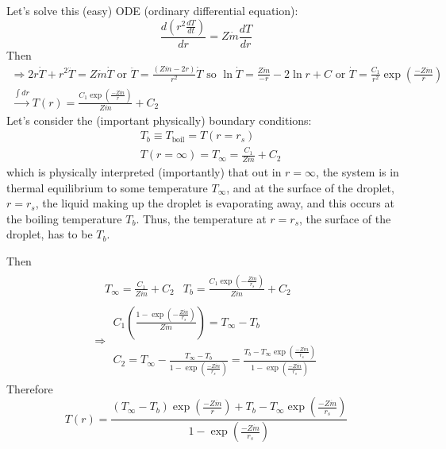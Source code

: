 \documentclass[10pt]{amsart}
\begin{document}
\begin{multicols*}{2}
Let's solve this (easy) ODE (ordinary differential equation):
\[
\frac{d (r^2 \frac{dT}{dt})}{dr} = Z\dot{m} \frac{dT}{dr}
\]
Then 
\[
\begin{gathered}
  \Longrightarrow 2r\dot{T} + r^2 \ddot{T} = Z\dot{m} \dot{T} \text{ or } \ddot{T} = \frac{(Z\dot{m}-2r)}{r^2} \dot{T} \text{ so } \ln{ \dot{T}} = \frac{Z\dot{m}}{-r} - 2\ln{r} + C \text{ or } \dot{T} = \frac{C_1}{r^2} \exp{ \left( \frac{-Z\dot{m }}{r} \right) } \\ 
  \xrightarrow{ \int dr } T(r) = \frac{C_1 \exp{ \left( \frac{-Z\dot{m}}{r} \right) } }{ Z\dot{m}} + C_2
\end{gathered}
\]
Let's consider the (important physically) boundary conditions:
\begin{equation}
  \begin{aligned}
    & T_b \equiv T_{\text{boil}} = T(r=r_s) \\ 
    & T(r=\infty) = T_{\infty} = \frac{C_1}{Z\dot{m}} + C_2
  \end{aligned}
\end{equation}
which is physically interpreted (importantly) that out in $r=\infty$, the system is in thermal equilibrium to some temperature $T_{\infty}$, and at the surface of the droplet, $r=r_s$, the liquid making up the droplet is evaporating away, and this occurs at the boiling temperature $T_b$.  Thus, the temperature at $r=r_s$, the surface of the droplet, has to be $T_b$.  

Then
\[
\begin{gathered}
  \begin{aligned}
    &  T_{\infty} = \frac{C_1}{Z\dot{m}} + C_2
    &  T_b = \frac{C_1 \exp{ \left( -\frac{Z\dot{m}}{r_s} \right) } }{Z\dot{m} } + C_2
  \end{aligned} \\
\Longrightarrow \begin{gathered} C_1 \left( \frac{1- \exp{ \left( -\frac{Z\dot{m}}{r_s} \right) } }{Z\dot{m}} \right) = T_{\infty} - T_b \\
  C_2 = T_{\infty} - \frac{T_{\infty} - T_b }{ 1 - \exp{ \left( \frac{-Z \dot{m}}{ r_s } \right) } } = \frac{ T_b - T_{\infty} \exp{ \left( \frac{-Z\dot{m}}{r_s } \right) } }{ 1 - \exp{ \left( \frac{-Z\dot{m}}{r_s } \right) } }
\end{gathered}
\end{gathered}
\]
Therefore
\begin{equation}
\boxed{   T(r) = \frac{ (T_{\infty} - T_b  ) \exp{ \left( \frac{-Z\dot{m}}{r} \right) } + T_b - T_{\infty} \exp{ \left( \frac{-Z\dot{m}}{r_s} \right) } }{ 1 - \exp{ \left( \frac{-Z\dot{m}}{r_s} \right) } } }
\end{equation}


\end{multicols*}
\end{document}
